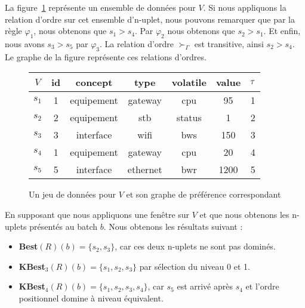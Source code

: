 La figure~\ref{fig:valid:domvision:architecture:pref} représente un ensemble de données pour $V$. Si nous appliquons la relation d'ordre sur cet ensemble d'n-uplet, nous pouvons remarquer que par la règle $\varphi_1$, nous obtenons que $s_1 > s_4$. Par $\varphi_2$ nous obtenons que $s_2 > s_1$. Et enfin, nous avons $s_3 > s_5$ par $\varphi_3$. La relation d'ordre $\succ_\Gamma$ est transitive, ainsi $s_2 > s_4$. Le graphe de la figure représente ces relations d'ordres.
\begin{figure}[ht]\centering
\begin{tabular}{|c|c|c|c|c|c|c|} \bottomrule
\rowcolor{hypcolor} $V$ & id & concept & type & volatile & value & $\tau$\\ \hline
$s_1$ & 1 & equipement & gateway & cpu & 95 & 1\\ \hline %
$s_2$ & 2 & equipement & stb & status & 1 & 2\\ \hline %
$s_3$ & 3 & interface & wifi & bws & 150 & 3\\ \hline %
$s_4$ & 1 & equipement & gateway & cpu & 20 & 4\\ \hline
$s_5$ & 5 & interface & ethernet & bwr & 1200 & 5\\ \toprule %
\end{tabular}\hspace{1cm}
\begin{minipage}{3cm}
\end{minipage}
\caption{Un jeu de données pour $V$ et son graphe de préférence correspondant}\label{fig:valid:domvision:architecture:pref}
\end{figure}

En supposant que nous appliquons une fenêtre sur $V$ et que nous obtenons les n-uplets présentés au batch $b$. Nous obtenons les résultats suivant : 
\begin{itemize}
	\item \textbf{Best}$(R)(b) = \{s_2,s_3\}$, car ces deux n-uplets ne sont pas dominés.
	\item \textbf{KBest}$_3(R)(b) = \{s_1,s_2,s_3\}$ par sélection du niveau 0 et 1.
	\item \textbf{KBest}$_4(R)(b) = \{s_1,s_2,s_3,s_4\}$, car $s_5$ est arrivé après $s_4$ et l'ordre positionnel domine à niveau équivalent.
\end{itemize}

